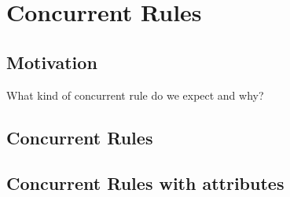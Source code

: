 \chapter{Concurrent Rules}

\section{Motivation}

What kind of concurrent rule do we expect and why?

\section{Concurrent Rules}

\section{Concurrent Rules with attributes}
